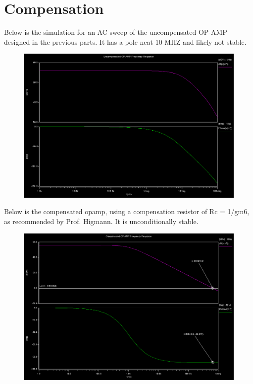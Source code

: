 \documentclass[12pt]{article}
\begin{document}
\section{Compensation}
Below is the simulation for an AC sweep of the uncompensated OP-AMP designed in the previous parts. It has a pole neat 10 MHZ and likely not stable.
\FloatBarrier
\begin{figure}[h!]
\begin{center}
 \includegraphics[scale=0.3]{./uncomp_f.png}
\end{center}
\end{figure}
\FloatBarrier

Below is the compensated opamp, using a compensation resistor of Rc = 1/gm6, as recommended by Prof. Higmann. It is unconditionally stable.

\FloatBarrier
\begin{figure}[h!]
\begin{center}
 \includegraphics[scale=0.3]{./comp_f.png}
\end{center}
\end{figure}
\FloatBarrier
\end{document}
